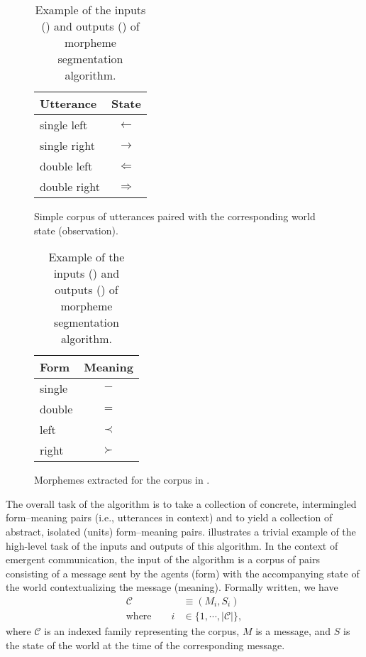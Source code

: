 \begin{table}
  \centering
  \hfill
  \begin{subfigure}[t]{0.4\linewidth}
    \centering
    \begin{tabular}{lc}
      \toprule
      Utterance & State \\
      \midrule
      single left & $\leftarrow$ \\
      single right & $\rightarrow$ \\
      double left & $\Leftarrow$ \\
      double right & $\Rightarrow$ \\
      \bottomrule
    \end{tabular}
    \caption{Simple corpus of utterances paired with the corresponding world state (observation).}
    \unskip\label{tab:seg-corp}
  \end{subfigure}
  \hfill
  \begin{subfigure}[t]{0.4\linewidth}
    \centering
    \begin{tabular}{lc}
      \toprule
      Form & Meaning \\
      \midrule
      single & $-$ \\
      double & $=$ \\
      left & $\prec$ \\
      right & $\succ$ \\
      \bottomrule
    \end{tabular}
    \caption{Morphemes extracted for the corpus in .}
    \unskip\label{tab:seg-morph}
  \end{subfigure}
  \hfill
  \caption{Example of the inputs () and outputs () of morpheme segmentation algorithm.}
  \unskip\label{tab:seg-example}
\end{table}


The overall task of the algorithm is to take a collection of concrete, intermingled form--meaning pairs (i.e., utterances in context) and to yield a collection of abstract, isolated (units) form--meaning pairs.
 illustrates a trivial example of the high-level task of the inputs and outputs of this algorithm.
In the context of emergent communication, the input of the algorithm is a corpus of pairs consisting of a message sent by the agents (form) with the accompanying state of the world contextualizing the message (meaning).
Formally written, we have
\begin{align}
  \mathcal C &\equiv (M_i, S_i) \\
  \text{where}\quad\quad i &\in \{1,\cdots,|\mathcal C|\}
  ,
\end{align}
where $\mathcal C$ is an indexed family representing the corpus, $M$ is a message, and $S$ is the state of the world at the time of the corresponding message.

